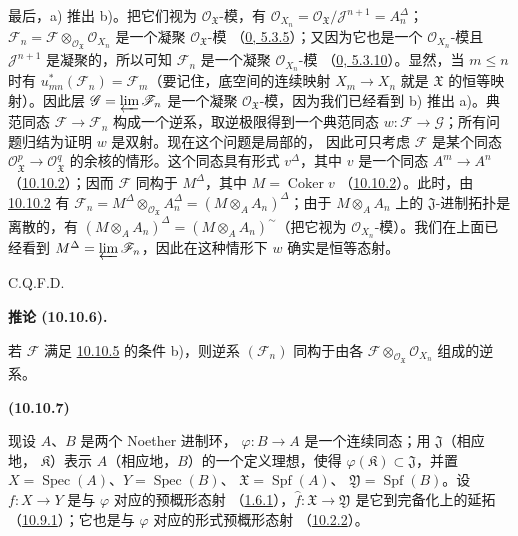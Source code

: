 \documentclass[UTF8,fontset=none,11pt,oneside,openany]{ctexbook}
\newenvironment{env}[1][]{%
  \par\medskip\noindent\textbf{(#1)}\ %
}{\par}
\newenvironment{corollary}[1][]{%
  \par\medskip\noindent\textbf{推论 (#1).}\ %
}{\par}
\let\EGAOriginalLabel\label
\renewcommand{\label}[1]{\phantomsection\EGAOriginalLabel{#1}}
\begin{document}
最后，a) 推出 b)。把它们视为 $\mathscr{O}_{\mathfrak{X}}$-模，有
$\mathscr{O}_{X_n}=\mathscr{O}_{\mathfrak{X}}/
\mathscr{J}^{n+1}=A_n^\Delta$；
$\mathscr{F}_n=\mathscr{F}
\otimes_{\mathscr{O}_{\mathfrak{X}}}\mathscr{O}_{X_n}$ 是一个凝聚
$\mathscr{O}_{\mathfrak{X}}$-模
（\hyperref[0.5.3.5-fr]{0, 5.3.5}）；又因为它也是一个
$\mathscr{O}_{X_n}$-模且 $\mathscr{J}^{n+1}$ 是凝聚的，所以可知
$\mathscr{F}_n$ 是一个凝聚 $\mathscr{O}_{X_n}$-模
（\hyperref[0.5.3.10-fr]{0, 5.3.10}）。显然，当 $m\leq n$ 时有
$u_{mn}^*(\mathscr{F}_n)=\mathscr{F}_m$（要记住，底空间的连续映射
$X_m\to X_n$ 就是 $\mathfrak{X}$ 的恒等映射）。因此层
$\mathscr{G}=\varprojlim\mathscr{F}_n$ 是一个凝聚
$\mathscr{O}_{\mathfrak{X}}$-模，因为我们已经看到 b) 推出 a)。典范同态
$\mathscr{F}\to\mathscr{F}_n$ 构成一个逆系，取逆极限得到一个典范同态
$w:\mathscr{F}\to\mathscr{G}$；所有问题归结为证明 $w$ 是双射。现在这个问题是局部的，
因此可只考虑 $\mathscr{F}$ 是某个同态
$\mathscr{O}_{\mathfrak{X}}^p\to\mathscr{O}_{\mathfrak{X}}^q$ 的余核的情形。这个同态具有形式
$v^\Delta$，其中 $v$ 是一个同态 $A^m\to A^n$
（\hyperref[I.10.10.2-fr]{10.10.2}）；因而 $\mathscr{F}$ 同构于 $M^\Delta$，其中
$M=\operatorname{Coker}v$
（\hyperref[I.10.10.2-fr]{10.10.2}）。此时，由
\hyperref[I.10.10.2-fr]{10.10.2} 有
$\mathscr{F}_n=M^\Delta\otimes_{\mathscr{O}_{\mathfrak{X}}}A_n^\Delta
=(M\otimes_A A_n)^\Delta$；由于 $M\otimes_A A_n$ 上的 $\mathfrak{J}$-进制拓扑是离散的，有
$(M\otimes_A A_n)^\Delta=(M\otimes_A A_n)^{\sim}$（把它视为
$\mathscr{O}_{X_n}$-模）。我们在上面已经看到
$M^\Delta=\varprojlim\mathscr{F}_n$，因此在这种情形下 $w$ 确实是恒等态射。
\par\hfill C.Q.F.D.\par

\begin{corollary}[10.10.6]
\label{I.10.10.6-fr}
若 $\mathscr{F}$ 满足 \hyperref[I.10.10.5-fr]{10.10.5} 的条件 b)，则逆系
$(\mathscr{F}_n)$ 同构于由各
$\mathscr{F}\otimes_{\mathscr{O}_{\mathfrak{X}}}\mathscr{O}_{X_n}$ 组成的逆系。
\end{corollary}

\begin{env}[10.10.7]
\label{I.10.10.7-fr}
现设 $A$、$B$ 是两个 Noether 进制环，
$\varphi:B\to A$ 是一个连续同态；用 $\mathfrak{J}$（相应地，
$\mathfrak{K}$）表示 $A$（相应地，$B$）的一个定义理想，使得
$\varphi(\mathfrak{K})\subset\mathfrak{J}$，并置
$X=\operatorname{Spec}(A)$、$Y=\operatorname{Spec}(B)$、
$\mathfrak{X}=\operatorname{Spf}(A)$、
$\mathfrak{Y}=\operatorname{Spf}(B)$。设 $f:X\to Y$ 是与 $\varphi$ 对应的预概形态射
（\hyperref[I.1.6.1-fr]{1.6.1}），$\widehat f:\mathfrak{X}\to
\mathfrak{Y}$ 是它到完备化上的延拓
（\hyperref[I.10.9.1-fr]{10.9.1}）；它也是与 $\varphi$ 对应的形式预概形态射
（\hyperref[I.10.2.2-fr]{10.2.2}）。
\end{env}
\end{document}
